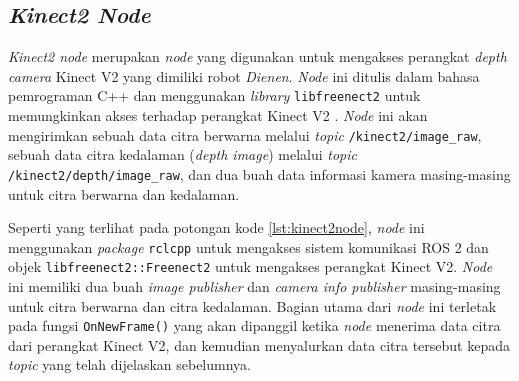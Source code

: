 \subsection{\emph{Kinect2 Node}}
\label{subsec:kinect2node}

\emph{Kinect2 node} merupakan \emph{node} yang digunakan untuk mengakses perangkat \emph{depth camera} Kinect V2 yang dimiliki robot \emph{Dienen}.
\emph{Node} ini ditulis dalam bahasa pemrograman C++ dan menggunakan \emph{library} \lstinline{libfreenect2} untuk memungkinkan akses terhadap perangkat Kinect V2 \citep{sft:libfreenect2}.
\emph{Node} ini akan mengirimkan sebuah data citra berwarna melalui \emph{topic} \lstinline{/kinect2/image_raw},
  sebuah data citra kedalaman (\emph{depth image}) melalui \emph{topic} \lstinline{/kinect2/depth/image_raw},
  dan dua buah data informasi kamera masing-masing untuk citra berwarna dan kedalaman.

Seperti yang terlihat pada potongan kode \ref{lst:kinect2node},
  \emph{node} ini menggunakan \emph{package} \lstinline{rclcpp} untuk mengakses sistem komunikasi ROS 2 dan objek \lstinline{libfreenect2::Freenect2} untuk mengakses perangkat Kinect V2.
\emph{Node} ini memiliki dua buah \emph{image publisher} dan \emph{camera info publisher} masing-masing untuk citra berwarna dan citra kedalaman.
Bagian utama dari \emph{node} ini terletak pada fungsi \lstinline{OnNewFrame()} yang akan dipanggil ketika \emph{node} menerima data citra dari perangkat Kinect V2,
  dan kemudian menyalurkan data citra tersebut kepada \emph{topic} yang telah dijelaskan sebelumnya.



